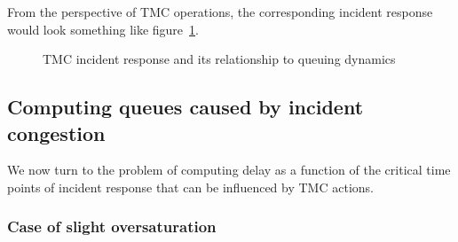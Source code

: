 \documentclass[12pt]{report}
\newcommand{\inputTikZ}[1]{%
    \begin{singlespace}
    \end{singlespace}
  }
\newcommand{\inputTikZ}[1]{%
    \begin{singlespace}
    \beginpgfgraphicnamed{#1-external}%
    \endpgfgraphicnamed%
    \end{singlespace}
  }
\newcounter{time}
\newcounter{space}
\begin{document}
From the perspective of \ac{TMC} operations, the corresponding incident
response would look something like
figure~\ref{fig:tmc-resp-and-queuing}.
\begin{figure}[tbp]
  \begin{center}
    \inputTikZ{figs/tmc-response-and-queuing}
    \caption{TMC incident response and its relationship to queuing dynamics}
    \label{fig:tmc-resp-and-queuing}
  \end{center}
\end{figure}

\subsection{Computing queues caused by incident congestion}
\label{sec:comp-queues}

We now turn to the problem of computing delay as a function of the
critical time points of incident response that can be influenced by
\ac{TMC} actions.


\subsubsection*{Case of slight oversaturation}
\end{document}
